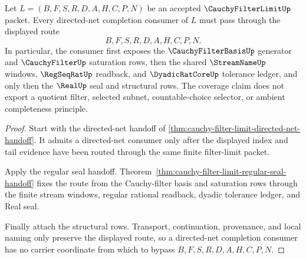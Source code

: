 \begin{theorem}
\label{thm:cauchy-filter-limit-directed-net-coverage}
Let $L=(B,F,S,R,D,A,H,C,P,N)$ be an accepted $\CauchyFilterLimitUp$ packet. Every directed-net completion consumer of $L$ must pass through the displayed route
$$
B,F,S,R,D,A,H,C,P,N .
$$
In particular, the consumer first exposes the $\CauchyFilterBasisUp$ generator and $\CauchyFilterUp$ saturation rows, then the shared $\StreamNameUp$ windows, $\RegSeqRatUp$ readback, and $\DyadicRatCoreUp$ tolerance ledger, and only then the $\RealUp$ seal and structural rows. The coverage claim does not export a quotient filter, selected subnet, countable-choice selector, or ambient completeness principle.
\end{theorem}
\begin{proof}
Start with the directed-net handoff of \autoref{thm:cauchy-filter-limit-directed-net-handoff}. It admits a directed-net consumer only after the displayed index and tail evidence have been routed through the same finite filter-limit packet.

Apply the regular seal handoff. Theorem~\ref{thm:cauchy-filter-limit-regular-seal-handoff} fixes the route from the Cauchy-filter basis and saturation rows through the finite stream windows, regular rational readback, dyadic tolerance ledger, and Real seal.

Finally attach the structural rows. Transport, continuation, provenance, and local naming only preserve the displayed route, so a directed-net completion consumer has no carrier coordinate from which to bypass $B,F,S,R,D,A,H,C,P,N$.
\end{proof}


